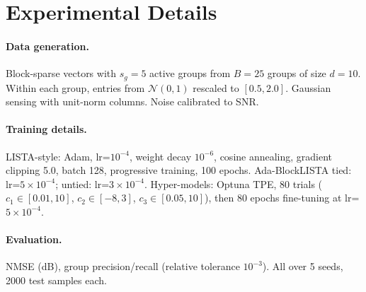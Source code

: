\documentclass{article}
\begin{document}
\section{Experimental Details}

\paragraph{Data generation.} Block-sparse vectors with $s_g{=}5$ active groups from $B{=}25$ groups of size $d{=}10$. Within each group, entries from $\mathcal{N}(0,1)$ rescaled to $[0.5, 2.0]$. Gaussian sensing with unit-norm columns. Noise calibrated to SNR.

\paragraph{Training details.} LISTA-style: Adam, lr=$10^{-4}$, weight decay $10^{-6}$, cosine annealing, gradient clipping 5.0, batch 128, progressive training, 100 epochs. Ada-BlockLISTA tied: lr=$5{\times}10^{-4}$; untied: lr=$3{\times}10^{-4}$. Hyper-models: Optuna TPE, 80 trials ($c_1 \in [0.01, 10]$, $c_2 \in [-8, 3]$, $c_3 \in [0.05, 10]$), then 80 epochs fine-tuning at lr=$5{\times}10^{-4}$.

\paragraph{Evaluation.} NMSE (dB), group precision/recall (relative tolerance $10^{-3}$). All over 5 seeds, 2000 test samples each.
\end{document}
